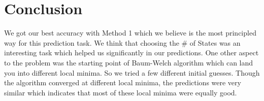 \documentclass[12pt]{article}
\begin{document}
\section*{Conclusion}
We got our best accuracy with Method 1 which we believe is the most principled way for this prediction task. We think that choosing the \# of States was an interesting task which helped us significantly in our predictions. One other aspect to the problem was the starting point of Baum-Welch algorithm which can land you into different local minima. So we tried a few different initial guesses. Though the algorithm converged at different local minima, the predictions were very similar which indicates that most of these local minima were equally good. 
\end{document}
